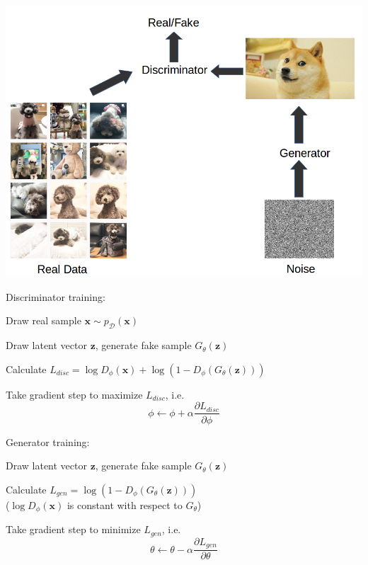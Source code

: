 \documentclass{beamer}
\let\tempone\itemize
\let\temptwo\enditemize
\renewenvironment{itemize}{\tempone\addtolength{\itemsep}{0.5\baselineskip}}{\temptwo}
\newcommand{\zvec}{\mathbf{z}}
\newcommand{\xvec}{\mathbf{x}}
\begin{document}
\begin{frame}
  \begin{center}
   \end{center}
   \center
\includegraphics[scale=0.3]{ara-gan}
\end{frame}



\begin{frame}
\begin{center}
\end{center}
Discriminator training:
\begin{itemize}
\item Draw real sample $\xvec \sim p_\mathcal{D}(\xvec)$ \pause
\item Draw latent vector $\zvec$, generate fake sample $G_\theta(\zvec)$ \pause
\item Calculate $L_{disc} = \log D_\phi(\xvec) + \log (1 - D_\phi(G_\theta(\zvec)))$ \pause
\item Take gradient step to maximize $L_{disc}$, i.e. \\
\[ \phi \leftarrow \phi + \alpha \frac{\partial L_{disc}}{\partial \phi}\]
\end{itemize}
\end{frame}

\begin{frame}
\begin{center}
\end{center}
Generator training:
\begin{itemize}
\item Draw latent vector $\zvec$, generate fake sample $G_\theta(\zvec)$ \pause
\item Calculate $L_{gen} = \log (1 - D_\phi(G_\theta(\zvec)))$ \\ 
($\log D_\phi(\xvec)$ is constant with respect to $G_\theta$) \pause
\item Take gradient step to minimize $L_{gen}$, i.e. \\
\[ \theta \leftarrow \theta - \alpha \frac{\partial L_{gen}}{\partial \theta}\]
\end{itemize}
\end{frame}
\end{document}
